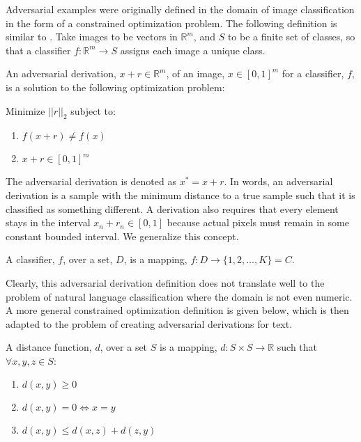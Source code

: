 Adversarial examples were originally defined in the domain of image classification in the form of a constrained optimization problem.  The following definition is similar to \cite{cs14}.  Take images to be vectors in $\mathbb{R}^m$, and $S$ to be a finite set of classes, so that a classifier $f:\mathbb{R}^m\rightarrow S$ assigns each image a unique class.

\begin{definition}
An adversarial derivation, $x + r \in \mathbb{R}^m$, of an image, $x \in [0,1]^m$ for a classifier, $f$, is a solution to the following optimization problem:
\end{definition}

\noindent
Minimize $||r||_2$ subject to:
\begin{enumerate}
\item $f(x + r) \neq f(x)$
\item $x+r \in [0,1]^m$
\end{enumerate}
The adversarial derivation is denoted as $x^* = x + r$.  In words, an adversarial derivation is a sample with the minimum distance to a true sample such that it is classified as something different.  A derivation also requires that every element stays in the interval $x_n+r_n \in [0,1]$ because actual pixels must remain in some constant bounded interval.  We generalize this concept.

\begin{definition}
A classifier, $f$, over a set, $D$, is a mapping, $f : D\rightarrow \{1,2,\dots,K\} = C$.
\end{definition}

Clearly, this adversarial derivation definition does not translate well to the problem of natural language classification where the domain is not even numeric.  A more general constrained optimization definition is given below, which is then adapted to the problem of creating adversarial derivations for text.

\begin{definition}
A distance function, $d$, over a set $S$ is a mapping, $d:S\times S\rightarrow \mathbb{R}$ such that $\forall x,y,z \in S$:
\begin{enumerate}
\itemsep0em
\item $d(x,y) \geq 0$
\item $d(x,y) = 0 \iff x=y$
\item $d(x,y) \leq d(x,z) + d(z,y)$
\end{enumerate}
\end{definition}

